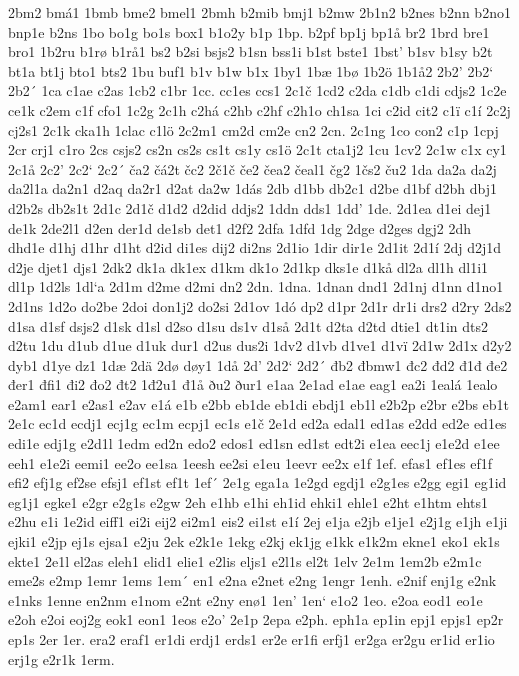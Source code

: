 2bm2
bmá1
1bmb
bme2
bmel1
2bmh
b2mib
bmj1
b2mw
2b1n2
b2nes
b2nn
b2no1
bnp1e
b2ns
1bo
bo1g
bo1s
box1
b1o2y
b1p
1bp.
b2pf
bp1j
bp1å
br2
1brd
bre1
bro1
1b2ru
b1rø
b1rå1
bs2
b2si
bsjs2
b1sn
bss1i
b1st
bste1
1bst'
b1sv
b1sy
b2t
bt1a
bt1j
bto1
bts2
1bu
buf1
b1v
b1w
b1x
1by1
1bæ
1bø
1b2ö
1b1å2
2b2'
2b2`
2b2´
1ca
c1ae
c2as
1cb2
c1br
1cc.
cc1es
ccs1
2c1č
1cd2
c2da
c1db
c1di
cdjs2
1c2e
ce1k
c2em
c1f
cfo1
1c2g
2c1h
c2há
c2hb
c2hf
c2h1o
ch1sa
1ci
c2id
cit2
c1ï
c1í
2c2j
cj2s1
2c1k
cka1h
1clac
c1lö
2c2m1
cm2d
cm2e
cn2
2cn.
2c1ng
1co
con2
c1p
1cpj
2cr
crj1
c1ro
2cs
csjs2
cs2n
cs2s
cs1t
cs1y
cs1ö
2c1t
cta1j2
1cu
1cv2
2c1w
c1x
cy1
2c1å
2c2'
2c2`
2c2´
ča2
čá2t
čc2
2č1č
če2
čea2
čeal1
čg2
1čs2
ču2
1da
da2a
da2j
da2l1a
da2n1
d2aq
da2r1
d2at
da2w
1dás
2db
d1bb
db2c1
d2be
d1bf
d2bh
dbj1
d2b2s
db2s1t
2d1c
2d1č
d1d2
d2did
ddjs2
1ddn
dds1
1dd'
1de.
2d1ea
d1ei
dej1
de1k
2de2l1
d2en
der1d
de1sb
det1
d2f2
2dfa
1dfd
1dg
2dge
d2ges
dgj2
2dh
dhd1e
d1hj
d1hr
d1ht
d2id
di1es
dij2
di2ns
2d1io
1dir
dir1e
2d1it
2d1í
2dj
d2j1d
d2je
djet1
djs1
2dk2
dk1a
dk1ex
d1km
dk1o
2d1kp
dks1e
d1kå
dl2a
dl1h
dl1i1
dl1p
1d2ls
1dl`a
2d1m
d2me
d2mi
dn2
2dn.
1dna.
1dnan
dnd1
2d1nj
d1nn
d1no1
2d1ns
1d2o
do2be
2doi
don1j2
do2si
2d1ov
1dó
dp2
d1pr
2d1r
dr1i
drs2
d2ry
2ds2
d1sa
d1sf
dsjs2
d1sk
d1sl
d2so
d1su
ds1v
d1så
2d1t
d2ta
d2td
dtie1
dt1in
dts2
d2tu
1du
d1ub
d1ue
d1uk
dur1
d2us
dus2i
1dv2
d1vb
d1ve1
d1vï
2d1w
2d1x
d2y2
dyb1
d1ye
dz1
1dæ
2dä
2dø
døy1
1då
2d'
2d2`
2d2´
đb2
đbmw1
đc2
đd2
đ1đ
đe2
đer1
đfi1
đi2
đo2
đt2
1đ2u1
đ1å
ðu2
ður1
e1aa
2e1ad
e1ae
eag1
ea2i
1ealá
1ealo
e2am1
ear1
e2as1
e2av
e1á
e1b
e2bb
eb1de
eb1di
ebdj1
eb1l
e2b2p
e2br
e2bs
eb1t
2e1c
ec1d
ecdj1
ecj1g
ec1m
ecpj1
ec1s
e1č
2e1d
ed2a
edal1
ed1as
e2dd
ed2e
ed1es
edi1e
edj1g
e2d1l
1edm
ed2n
edo2
edos1
ed1sn
ed1st
edt2i
e1ea
eec1j
e1e2d
e1ee
eeh1
e1e2i
eemi1
ee2o
ee1sa
1eesh
ee2si
e1eu
1eevr
ee2x
e1f
1ef.
efas1
ef1es
ef1f
efi2
efj1g
ef2se
efsj1
ef1st
ef1t
1ef´
2e1g
ega1a
1e2gd
egdj1
e2g1es
e2gg
egi1
eg1id
eg1j1
egke1
e2gr
e2g1s
e2gw
2eh
e1hb
e1hi
eh1id
ehki1
ehle1
e2ht
e1htm
ehts1
e2hu
e1i
1e2id
eiff1
ei2i
eij2
ei2m1
eis2
ei1st
e1í
2ej
e1ja
e2jb
e1je1
e2j1g
e1jh
e1ji
ejki1
e2jp
ej1s
ejsa1
e2ju
2ek
e2k1e
1ekg
e2kj
ek1jg
e1kk
e1k2m
ekne1
eko1
ek1s
ekte1
2e1l
el2as
eleh1
elid1
elie1
e2lis
eljs1
e2l1s
el2t
1elv
2e1m
1em2b
e2m1c
eme2s
e2mp
1emr
1ems
1em´
en1
e2na
e2net
e2ng
1engr
1enh.
e2nif
enj1g
e2nk
e1nks
1enne
en2nm
e1nom
e2nt
e2ny
enø1
1en'
1en`
e1o2
1eo.
e2oa
eod1
eo1e
e2oh
e2oi
eoj2g
eok1
eon1
1eos
e2o'
2e1p
2epa
e2ph.
eph1a
ep1in
epj1
epjs1
ep2r
ep1s
2er
1er.
era2
eraf1
er1di
erdj1
erds1
er2e
er1fi
erfj1
er2ga
er2gu
er1id
er1io
erj1g
e2r1k
1erm.

